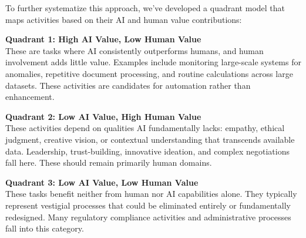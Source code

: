 \documentclass[
  Letterpaper,
]{scrbook}
\begin{document}
To further systematize this approach, we've developed a quadrant model
that maps activities based on their AI and human value contributions:

\begin{figure}


\caption{\label{fig-enhancement-framework}}

\end{figure}%

\textbf{Quadrant 1: High AI Value, Low Human Value}\\
These are tasks where AI consistently outperforms humans, and human
involvement adds little value. Examples include monitoring large-scale
systems for anomalies, repetitive document processing, and routine
calculations across large datasets. These activities are candidates for
automation rather than enhancement.

\textbf{Quadrant 2: Low AI Value, High Human Value}\\
These activities depend on qualities AI fundamentally lacks: empathy,
ethical judgment, creative vision, or contextual understanding that
transcends available data. Leadership, trust-building, innovative
ideation, and complex negotiations fall here. These should remain
primarily human domains.

\textbf{Quadrant 3: Low AI Value, Low Human Value}\\
These tasks benefit neither from human nor AI capabilities alone. They
typically represent vestigial processes that could be eliminated
entirely or fundamentally redesigned. Many regulatory compliance
activities and administrative processes fall into this category.
\end{document}

